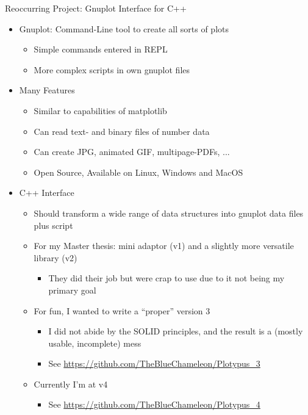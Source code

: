 
\begin{frame}[fragile]{Reoccurring Project: Gnuplot Interface for C++}
%
\begin{itemize}
\item Gnuplot: Command-Line tool to create all sorts of plots
	\begin{itemize}
	\item Simple commands entered in REPL
	\item More complex scripts in own gnuplot files
	\end{itemize}
\item Many Features
	\begin{itemize}
	\item Similar to capabilities of matplotlib
	\item Can read text- and binary files of number data
	\item Can create JPG, animated GIF, multipage-PDFs, ...
	\item Open Source, Available on Linux, Windows and MacOS
	\end{itemize}
	\pause
\item C++ Interface
	\begin{itemize}
	\item Should transform a wide range of data structures into gnuplot data files plus script
		\pause
	\item For my Master thesis: mini adaptor (v1) and a slightly more versatile library (v2)
		\begin{itemize}
		\item They did their job but were crap to use due to it not being my primary goal
		\end{itemize}
		\pause
	\item For fun, I wanted to write a \enquote{proper} version 3
		\begin{itemize}
		\item I did not abide by the SOLID principles, and the result is a (mostly usable, incomplete) mess
		\item See \url{https://github.com/TheBlueChameleon/Plotypus_3}
		\end{itemize}
		\pause
	\item Currently I'm at v4
		\begin{itemize}
		\item See \url{https://github.com/TheBlueChameleon/Plotypus_4}
		\end{itemize}
	\end{itemize}
\end{itemize}
%
\end{frame}

